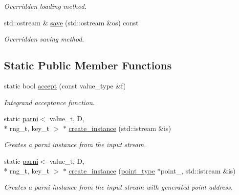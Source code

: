 \begin{DoxyCompactItemize}
\begin{DoxyCompactList}\small\item\em Overridden loading method. \end{DoxyCompactList}\item 
\hypertarget{a00384_ae759d8f20aa1a24355b2fa42d9545eff}{std\-::ostream \& \hyperlink{a00384_ae759d8f20aa1a24355b2fa42d9545eff}{save} (std\-::ostream \&os) const }\label{a00384_ae759d8f20aa1a24355b2fa42d9545eff}

\begin{DoxyCompactList}\small\item\em Overridden saving method. \end{DoxyCompactList}\end{DoxyCompactItemize}
\subsection*{Static Public Member Functions}
\begin{DoxyCompactItemize}
\item 
\hypertarget{a00384_adfaf53c2c3017e2a85860eb49b3cd7e8}{static bool \hyperlink{a00384_adfaf53c2c3017e2a85860eb49b3cd7e8}{accept} (const value\-\_\-type \&f)}\label{a00384_adfaf53c2c3017e2a85860eb49b3cd7e8}

\begin{DoxyCompactList}\small\item\em Integrand acceptance function. \end{DoxyCompactList}\item 
\hypertarget{a00384_aa3f691d874fc14db7b726c6e5dd0e90e}{static \hyperlink{a00384}{parni}$<$ value\-\_\-t, D, \\*
rng\-\_\-t, key\-\_\-t $>$ $\ast$ \hyperlink{a00384_aa3f691d874fc14db7b726c6e5dd0e90e}{create\-\_\-instance} (std\-::istream \&is)}\label{a00384_aa3f691d874fc14db7b726c6e5dd0e90e}

\begin{DoxyCompactList}\small\item\em Creates a parni instance from the input stream. \end{DoxyCompactList}\item 
static \hyperlink{a00384}{parni}$<$ value\-\_\-t, D, \\*
rng\-\_\-t, key\-\_\-t $>$ $\ast$ \hyperlink{a00384_a183431b0c979f18283ffd2b10f04d495}{create\-\_\-instance} (\hyperlink{a00559}{point\-\_\-type} $\ast$point\-\_\-, std\-::istream \&is)
\begin{DoxyCompactList}\small\item\em Creates a parni instance from the input stream with generated point address. \end{DoxyCompactList}\end{DoxyCompactItemize}

